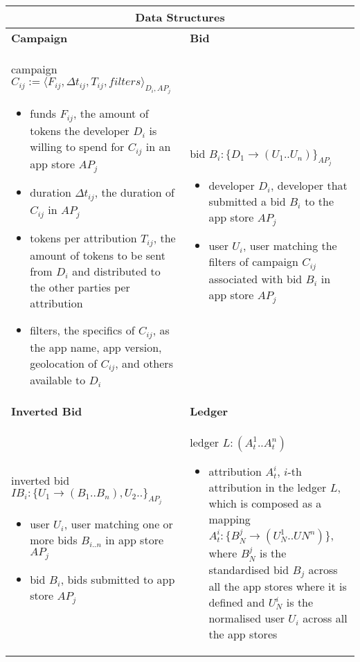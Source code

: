 \begin{table}[H]
\footnotesize
\centering
\begin{tabular}{|p{}p{}|}
\hline
\multicolumn{2}{|c|}{Data Structures} \\
\hline
\textbf{Campaign} & \textbf{Bid} \\
campaign $C_{ij} := \langle F_{ij}, \Delta t_{ij}, T_{ij}, filters \rangle_{D_{i}, AP_{j}}$
\begin{itemize}
	\item funds $F_{ij}$, the amount of tokens the developer $D_{i}$ is willing to spend for $C_{ij}$ in an app store $AP_{j}$
	\item duration $\Delta t_{ij}$, the duration of $C_{ij}$ in $AP_{j}$
	\item tokens per attribution $T_{ij}$, the amount of tokens to be sent from $D_{i}$ and distributed to the other parties per attribution
	\item filters, the specifics of $C_{ij}$, as the app name, app version, geolocation of $C_{ij}$, and others available to $D_{i}$
\end{itemize}
& bid $B_i : \{D_1 \to (U_1..U_n)\}_{AP_j}$
\begin{itemize}
	\item developer $D_i$, developer that submitted a bid $B_i$ to the app store $AP_j$ 
	\item user $U_i$, user matching the filters of campaign $C_{ij}$ associated with bid $B_i$ in app store $AP_j$
\end{itemize} \\
\textbf{Inverted Bid} & \textbf{Ledger} \\
inverted bid $IB_i : \{U_1 \to (B_1..B_n), U_2..\}_{AP_j}$
\begin{itemize}
	\item user $U_i$, user matching one or more bids $B_{i..n}$ in app store $AP_j$
	\item bid $B_i$, bids submitted to app store $AP_j$
\end{itemize}
& ledger $L : (A^{1}_{t}..A^{n}_{t})$
\begin{itemize}
	\item attribution $A^{i}_{t}$, $i$-th attribution in the ledger $L$, which is composed as a mapping $A^{i}_{t} : \{B_{N}^{j} \to (U_{N}^{1}..U{N}^{n})\}$, where $B_{N}^{j}$ is the standardised bid $B_j$ across all the app stores where it is defined and $U_{N}^{i}$ is the normalised user $U_i$ across all the app stores
\end{itemize} \\

\end{tabular}
\end{table}
